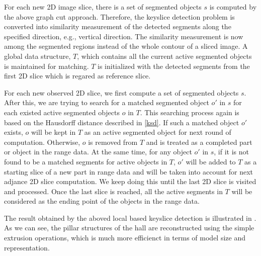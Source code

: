 For each new 2D image slice, there is a set of segmented objects $s$ is computed
by the above graph cut approach. Therefore, the keyslice detection problem is converted
into similarity measurement of the detected segments along the specified direction, 
e.g., vertical direction.
The similarity measurement is now among the segmented regions instead of the whole
contour of a sliced image. A global data structure, $T$, which contains all the current 
active segmented objects is maintained for matching. $T$ is initialized with the
detected segments from the first 2D slice which is regared as reference slice. 

For each new observed 2D slice, we first compute a set of segmented objects $s$. 
After this, we are trying to search for a matched segmented object $o'$ in $s$ for 
each existed active segmented objects $o$ in $T$. This searching process again is 
based on the Hausdorff distance described in \ref{ksd}. If such a matched object $o'$
exists, $o$ will be kept in $T$ as an active segmented object for next round of
computation. Otherwise, $o$ is removed from $T$ and is treated as a completed part or
object in the range data. At the same time, for any object $o'$ in $s$, if it is 
not found to be a matched segments for active objects in $T$, $o'$ will be added
to $T$ as a starting slice of a new part in range data and will be taken into
account for next adjance 2D slice computation. We keep doing this until the last
2D slice is visited and processed. Once the last slice is reached, all the active
segments in $T$ will be considered as the ending point of the objects in the range data.

The result obtained by the aboved local based keyslice detection is illustrated in 
. As we can see, the pillar structures of the hall are reconstructed
using the simple extrusion operations, which is much more efficienct in terms of 
model size and representation.








